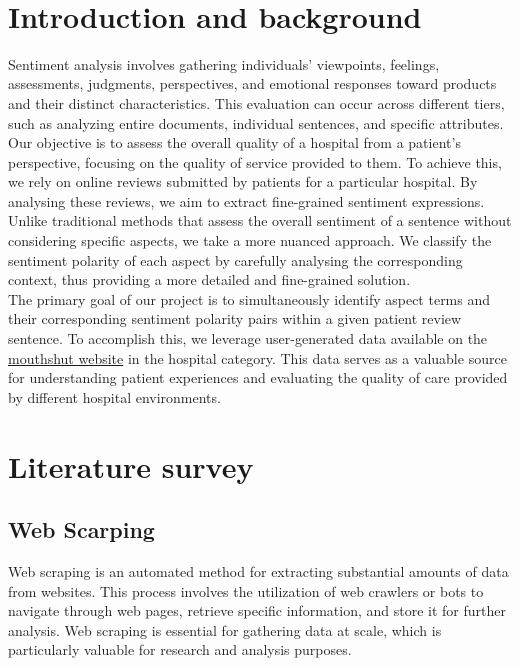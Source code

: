 \begin{center}
{\huge\textbf{\ttitle}}\\
\end{center}
\section{Introduction and background}
Sentiment analysis involves gathering individuals' viewpoints, feelings, assessments, judgments, perspectives, and emotional responses toward products and their distinct characteristics. This evaluation can occur across different tiers, such as analyzing entire documents, individual sentences, and specific attributes.
\\
Our objective is to assess the overall quality of a hospital from a patient's perspective, focusing on the quality of service provided to them. To achieve this, we rely on online reviews submitted by patients for a particular hospital. By analysing these reviews, we aim to extract fine-grained sentiment expressions.
\\
Unlike traditional methods that assess the overall sentiment of a sentence without considering specific aspects, we take a more nuanced approach. We classify the sentiment polarity of each aspect by carefully analysing the corresponding context, thus providing a more detailed and fine-grained solution.
\\
The primary goal of our project is to simultaneously identify aspect terms and their corresponding sentiment polarity pairs within a given patient review sentence. To accomplish this, we leverage user-generated data available on the \href{www.mouthshut.com}{mouthshut website} in the hospital category. This data serves as a valuable source for understanding patient experiences and evaluating the quality of care provided by different hospital environments.
\clearpage
\section{Literature survey}
\subsection{Web Scarping}
Web scraping is an automated method for extracting substantial amounts of data from websites. This process involves the utilization of web crawlers or bots to navigate through web pages, retrieve specific information, and store it for further analysis. Web scraping is essential for gathering data at scale, which is particularly valuable for research and analysis purposes.
